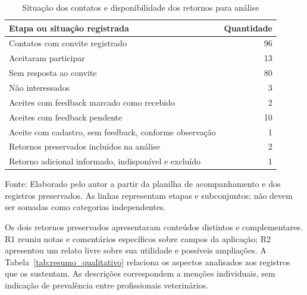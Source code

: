 \documentclass{UNESC}
\begin{document}
\begin{table}[htbp]
\centering
\caption{Situação dos contatos e disponibilidade dos retornos para análise}
\label{tab:recrutamento}
\small
\setlength{\tabcolsep}{5pt}
\renewcommand{\arraystretch}{1.15}
\begin{tabular}{@{}p{} r@{}}
\hline
\textbf{Etapa ou situação registrada} & \textbf{Quantidade} \\
\hline
Contatos com convite registrado & 96 \\
Aceitaram participar & 13 \\
Sem resposta ao convite & 80 \\
Não interessados & 3 \\
Aceites com feedback marcado como recebido & 2 \\
Aceites com feedback pendente & 10 \\
Aceite com cadastro, sem feedback, conforme observação & 1 \\
Retornos preservados incluídos na análise & 2 \\
Retorno adicional informado, indisponível e excluído & 1 \\
\hline
\end{tabular}
\par\vspace{2pt}
{\footnotesize\raggedright Fonte: Elaborado pelo autor a partir da planilha de acompanhamento e dos registros preservados. As linhas representam etapas e subconjuntos; não devem ser somadas como categorias independentes.\par}
\end{table}

Os dois retornos preservados apresentaram conteúdos distintos e complementares. R1 reuniu notas e comentários específicos sobre campos da aplicação; R2 apresentou um relato livre sobre sua utilidade e possíveis ampliações. A Tabela~\ref{tab:resumo_qualitativo} relaciona os aspectos analisados aos registros que os sustentam. As descrições correspondem a menções individuais, sem indicação de prevalência entre profissionais veterinários.
\end{document}
